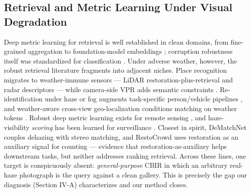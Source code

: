 \documentclass[journal]{IEEEtran}
\begin{document}
\subsection{Retrieval and Metric Learning Under Visual Degradation}
Deep metric learning for retrieval is well established in clean domains,
from fine-grained aggregation \cite{wei2017scda} to foundation-model
embeddings \cite{radford2021clip,zhai2023siglip,oquab2023dinov2}; corruption
robustness itself was standardized for classification
\cite{hendrycks2019imagenetc}. Under adverse weather, however, the robust
retrieval literature fragments into adjacent niches. Place recognition
migrates to weather-immune sensors --- LiDAR restoration-plus-retrieval
\cite{kuang2025reslpr,zhao2025itdnet} and radar descriptors
\cite{choi2024referee,jang2023raplace} --- while camera-side VPR adds
semantic constraints \cite{zhao2025sbc}. Re-identification under haze or
fog augments task-specific person/vehicle pipelines
\cite{chen2022rvsl,cai2026dwreid,tran2026uavreid,kim2025fogreid}, and
weather-aware cross-view geo-localization conditions matching on weather
tokens \cite{wang2022sample,xu2026weather}. Robust deep metric learning
exists for remote sensing \cite{zhang2026glrt}, and haze-visibility
\emph{scoring} has been learned for surveillance \cite{chen2026hazerank}.
Closest in spirit, DeMatchNet \cite{liu2025dematchnet} couples dehazing
with stereo matching, and RestoCrowd \cite{kong2025restocrowd} uses
restoration as an auxiliary signal for counting --- evidence that
restoration-as-auxiliary helps downstream tasks, but neither addresses
ranking retrieval. Across these lines, one target is conspicuously absent:
\emph{general-purpose} CBIR in which an arbitrary real-haze photograph is the
query against a clean gallery. This is precisely the gap our diagnosis
(Section IV-A) characterizes and our method closes.
\end{document}
